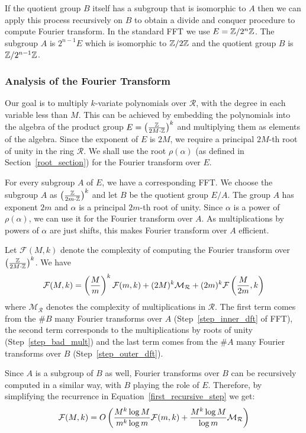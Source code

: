 \documentclass[11pt]{article}
\begin{document}
If the quotient group $B$ itself has a subgroup that is isomorphic to
$A$ then we can apply this process recursively on $B$ to obtain a divide and
conquer procedure to compute Fourier transform. In the standard FFT we
use $E = \mathbb{Z}/2^n\mathbb{Z}$. The subgroup $A$ is $2^{n-1}E$ which is isomorphic
to $\mathbb{Z}/2\mathbb{Z}$ and the quotient group $B$ is $\mathbb{Z}/2^{n-1}\mathbb{Z}$.

\subsubsection*{Analysis of the Fourier Transform}

Our goal is to multiply $k$-variate polynomials over $\mathcal{R}$, with the
degree in each variable less than $M$. This can be achieved by
embedding the polynomials into the algebra of the product group $E =
\left(\frac{\mathbb{Z}}{2M\cdot \mathbb{Z}}\right)^k$ and multiplying them as elements of
the algebra. Since the exponent of $E$ is $2M$, we require a principal
$2M$-th root of unity in the ring $\mathcal{R}$. We shall use the root
$\rho(\alpha)$ (as defined in Section~\ref{root_section}) for the
Fourier transform over $E$.

For every subgroup $A$ of $E$, we have a corresponding FFT. We choose
the subgroup $A$ as $\left(\frac{\mathbb{Z}}{2m\cdot \mathbb{Z}}\right)^k$ and let $B$ be
the quotient group $E/A$. The group $A$ has exponent $2m$ and $\alpha$
is a principal $2m$-th root of unity. Since $\alpha$ is a power of
$\rho(\alpha)$, we can use it for the Fourier transform over $A$. As
multiplications by powers of $\alpha$ are just shifts, this makes
Fourier transform over $A$ efficient.

Let $\mathcal{F}(M,k)$ denote the complexity of computing the Fourier transform
over $\left(\frac{\mathbb{Z}}{2M\cdot \mathbb{Z}}\right)^k$. We have
\begin{equation}
\mathcal{F}(M,k) = \left(\frac{M}{m}\right)^k \mathcal{F}(m,k) + (2M)^k
\mathcal{M}_{\mathcal{R}}+(2m)^k\mathcal{F}\left(\frac{M}{2m},k\right)
\label{first_recursive_step}
\end{equation}
where $\mathcal{M}_{\mathcal{R}}$ denotes the complexity of multiplications in
$\mathcal{R}$. The first term comes from the $\# B$ many Fourier transforms
over $A$ (Step~\ref{step_inner_dft} of FFT), the second term
corresponds to the multiplications by roots of unity
(Step~\ref{step_bad_mult}) and the last term comes from the $\# A$
many Fourier transforms over $B$ (Step~\ref{step_outer_dft}).

Since $A$ is a subgroup of $B$ as well, Fourier transforms over $B$
can be recursively computed in a similar way, with $B$ playing the
role of $E$. Therefore, by simplifying the recurrence in
Equation~\ref{first_recursive_step} we get:
\begin{equation}
\mathcal{F}(M,k) = O\left(\frac{M^k\log M}{m^k\log m}\mathcal{F}(m,k) +
  \frac{M^k\log M}{\log m}\mathcal{M}_{\mathcal{R}}\right)
\label{eqn_with_Fa}
\end{equation}
\end{document}
